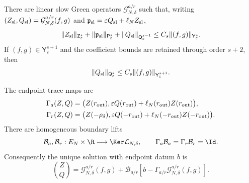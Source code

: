 \begin{proposition}
There are linear slow Green operators
\(\mathcal G^{a/r}_{N,\delta}\) such that, writing
\((Z_{\rm sl},Q_{\rm sl})=\mathcal G^{a/r}_{N,\delta}(f,g)\) and
\(\mathfrak p_{\rm sl}=\varepsilon Q_{\rm sl}+\ell_NZ_{\rm sl}\),
\begin{equation}
 \|Z_{\rm sl}\|_{\mathsf Z_\varepsilon^s}
 +\|\mathfrak p_{\rm sl}\|_{\mathsf P_\varepsilon^s}
 +\|Q_{\rm sl}\|_{\mathsf Q_\varepsilon^{s-1}}
 \le C_s\|(f,g)\|_{\mathsf Y_\varepsilon^s}.       \label{eq:principal-green-slow-bound}
\end{equation}
If \((f,g)\in\mathsf Y_\varepsilon^{s+1}\) and the coefficient bounds are
retained through order \(s+2\), then
\begin{equation}
 \|Q_{\rm sl}\|_{\mathsf Q_\varepsilon^s}
 \le C_s\|(f,g)\|_{\mathsf Y_\varepsilon^{s+1}}.  \label{eq:principal-green-extra-q-derivative}
\end{equation}

The endpoint trace maps are
\begin{align}
 \Gamma_a(Z,Q)
 &=\bigl(Z(r_{\rm out}),
   \varepsilon Q(r_{\rm out})
       +\ell_N(r_{\rm out})Z(r_{\rm out})\bigr),\notag\\
 \Gamma_r(Z,Q)
 &=\bigl(Z(-\rho_\delta),
   \varepsilon Q(-r_{\rm out})
       +\ell_N(-r_{\rm out})Z(-r_{\rm out})\bigr).
                                                               \label{eq:principal-green-traces}
\end{align}
There are homogeneous boundary lifts
\begin{equation}
 \mathcal B_a,\mathcal B_r:E_N\times\R
          \longrightarrow\Ker\mathcal L_{N,\delta},
 \qquad \Gamma_a\mathcal B_a=\Gamma_r\mathcal B_r=\Id.       \label{eq:principal-green-lifts}
\end{equation}
Consequently the unique solution with endpoint datum \(b\) is
\begin{equation}
 \binom ZQ
 =\mathcal G^{a/r}_{N,\delta}(f,g)
  +\mathcal B_{a/r}\left[
      b-\Gamma_{a/r}\mathcal G^{a/r}_{N,\delta}(f,g)\right]. \label{eq:principal-green-augmented-inverse}
\end{equation}


\end{proposition}
